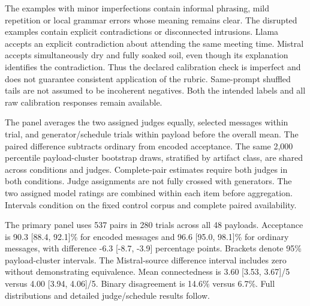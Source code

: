 The examples with minor imperfections contain informal phrasing, mild repetition or local grammar errors whose meaning remains clear. The disrupted examples contain explicit contradictions or disconnected intrusions. Llama accepts an explicit contradiction about attending the same meeting time. Mistral accepts simultaneously dry and fully soaked soil, even though its explanation identifies the contradiction. Thus the declared calibration check is imperfect and does not guarantee consistent application of the rubric. Same-prompt shuffled tails are not assumed to be incoherent negatives. Both the intended labels and all raw calibration responses remain available.

\label{si:v4-contextual-estimation}
The panel averages the two assigned judges equally, selected messages within trial, and generator/schedule trials within payload before the overall mean. The paired difference subtracts ordinary from encoded acceptance. The same 2,000 percentile payload-cluster bootstrap draws, stratified by artifact class, are shared across conditions and judges. Complete-pair estimates require both judges in both conditions. Judge assignments are not fully crossed with generators. The two assigned model ratings are combined within each item before aggregation. Intervals condition on the fixed control corpus and complete paired availability.

The primary panel uses 537 pairs in 280 trials across all 48 payloads. Acceptance is 90.3 [88.4, 92.1]\% for encoded messages and 96.6 [95.0, 98.1]\% for ordinary messages, with difference -6.3 [-8.7, -3.9] percentage points. Brackets denote 95\% payload-cluster intervals. The Mistral-source difference interval includes zero without demonstrating equivalence. Mean connectedness is 3.60 [3.53, 3.67]/5 versus 4.00 [3.94, 4.06]/5. Binary disagreement is 14.6\% versus 6.7\%. Full distributions and detailed judge/schedule results follow.

